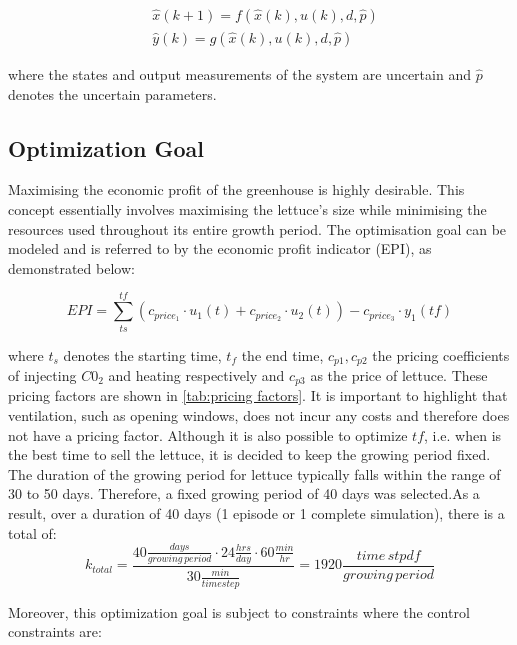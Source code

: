 \begin{equation}\label{eq:greenhouse_model_discrete_uncertain}
	\begin{aligned}
		& \hat x(k+1) = f(\hat x(k),u(k),d,\hat p) \\
		& \hat y(k) = g(\hat x(k),u(k),d,\hat p)
	\end{aligned}
\end{equation}

where the states and output measurements of the system are uncertain and $\hat{p}$ denotes the uncertain parameters.



\subsection{Optimization Goal}
\label{ssection:optimization-goal}
Maximising the economic profit of the greenhouse is highly desirable. This concept essentially involves maximising the lettuce's size while minimising the resources used throughout its entire growth period. The optimisation goal can be modeled and is referred to by the economic profit indicator (EPI), as demonstrated below:

\begin{equation}\label{eq:epi}
	EPI = \sum_{ts}^{tf} (c_{price_1} \cdot u_1(t) + c_{price_2} \cdot u_2(t)) - c_{price_3} \cdot y_1(tf)
\end{equation}

where $t_s$ denotes the starting time, $t_f$ the end time, $c_{p1},c_{p2}$ the pricing coefficients of injecting $C0_2$ and heating respectively and $c_{p3}$ as the price of lettuce. These pricing factors are shown in \autoref{tab:pricing factors}. It is important to highlight that ventilation, such as opening windows, does not incur any costs and therefore does not have a pricing factor. Although it is also possible to optimize $tf$, i.e. when is the best time to sell the lettuce, it is decided to keep the growing period fixed. The duration of the growing period for lettuce typically falls within the range of 30 to 50 days. Therefore, a fixed growing period of 40 days was selected.As a result, over a duration of 40 days (1 episode or 1 complete simulation), there is a total of:
$$
k_{total} = \frac{40 \frac{days}{growing \, period} \cdot 24 \frac{hrs}{day} \cdot 60 \frac{min}{hr}}{30 \frac{min}{timestep}} = 1920 \frac{time \, stpdf}{growing \, period}
$$

Moreover, this optimization goal is subject to constraints where the control constraints are:

